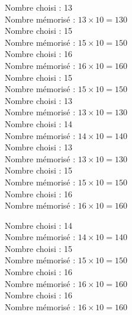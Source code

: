 \documentclass[a4paper,11pt,fleqn]{article}
\begin{document}
\pagestyle{empty}



Nombre choisi : 13 \\
Nombre mémorisé : $13\times10=130$ \\

\bigskip
Nombre choisi : 15 \\
Nombre mémorisé : $15\times10=150$ \\

\bigskip
Nombre choisi : 16 \\
Nombre mémorisé : $16\times10=160$ \\

\bigskip
Nombre choisi : 15 \\
Nombre mémorisé : $15\times10=150$ \\

\bigskip
Nombre choisi : 13 \\
Nombre mémorisé : $13\times10=130$ \\

\bigskip
Nombre choisi : 14 \\
Nombre mémorisé : $14\times10=140$ \\

\bigskip
Nombre choisi : 13 \\
Nombre mémorisé : $13\times10=130$ \\

\bigskip
Nombre choisi : 15 \\
Nombre mémorisé : $15\times10=150$ \\

\bigskip
Nombre choisi : 16 \\
Nombre mémorisé : $16\times10=160$ \\

\bigskip

\newpage
\setcounter{exo}{0}
\setcounter{section}{0}

Nombre choisi : 14 \\
Nombre mémorisé : $14\times10=140$ \\

\bigskip
Nombre choisi : 15 \\
Nombre mémorisé : $15\times10=150$ \\

\bigskip
Nombre choisi : 16 \\
Nombre mémorisé : $16\times10=160$ \\

\bigskip
Nombre choisi : 16 \\
Nombre mémorisé : $16\times10=160$ \\
\end{document}
